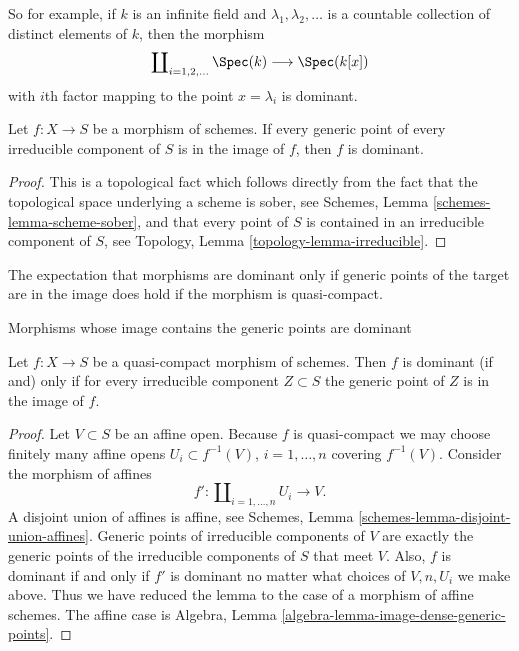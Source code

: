 \noindent
So for example, if $k$ is an infinite field and $\lambda_1, \lambda_2, \ldots$
is a countable collection of distinct elements of $k$, then the morphism
$$
\coprod\nolimits_{i = 1, 2, \ldots } \Spec(k)
\longrightarrow
\Spec(k[x])
$$
with $i$th factor mapping to the point $x = \lambda_i$ is dominant.

\begin{lemma}
\label{lemma-generic-points-in-image-dominant}
Let $f : X \to S$ be a morphism of schemes.
If every generic point of every irreducible component of $S$
is in the image of $f$, then $f$ is dominant.
\end{lemma}

\begin{proof}
This is a topological fact which follows directly from the fact that
the topological space underlying a scheme is sober, see
Schemes, Lemma \ref{schemes-lemma-scheme-sober}, and that
every point of $S$ is contained in an irreducible component of
$S$, see Topology, Lemma \ref{topology-lemma-irreducible}.
\end{proof}

\noindent
The expectation that morphisms are dominant only if generic points of the
target are in the image does hold if the morphism is quasi-compact.

\begin{lemma}
\label{lemma-quasi-compact-dominant}
\begin{slogan}
Morphisms whose image contains the generic points are dominant
\end{slogan}
Let $f : X \to S$ be a quasi-compact morphism of schemes.
Then $f$ is dominant (if and) only if for every irreducible
component $Z \subset S$ the generic point of $Z$ is in the
image of $f$.
\end{lemma}

\begin{proof}
Let $V \subset S$ be an affine open.
Because $f$ is quasi-compact we may choose finitely many affine
opens $U_i \subset f^{-1}(V)$, $i = 1, \ldots, n$ covering
$f^{-1}(V)$. Consider the morphism of affines
$$
f' :
\coprod\nolimits_{i = 1, \ldots, n} U_i
\longrightarrow
V.
$$
A disjoint union of affines is affine, see
Schemes, Lemma \ref{schemes-lemma-disjoint-union-affines}.
Generic points of irreducible components of $V$
are exactly the generic points of the irreducible components of
$S$ that meet $V$. Also, $f$ is dominant if and only if $f'$ is dominant
no matter what choices of $V, n, U_i$ we make above. Thus we
have reduced the lemma to the case of a morphism of affine schemes.
The affine case is
Algebra, Lemma \ref{algebra-lemma-image-dense-generic-points}.
\end{proof}

